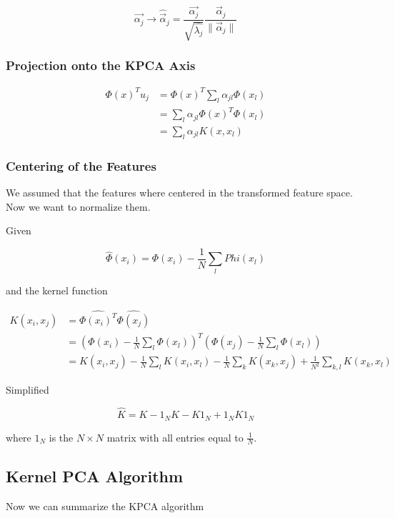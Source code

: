 \[
    \vec{\alpha_j} \to \hat{\vec{\alpha}}_j = \frac{\vec{\alpha_j}}{\sqrt{\hat{\lambda_j}}} \frac{\vec{\alpha}_j}{\|\vec{\alpha}_j\|}
\]

\subsubsection{Projection onto the KPCA Axis}

\begin{align*}
    \Phi(x)^T u_j &= \Phi(x)^T \sum_{l} \alpha_{jl} \Phi(x_l) \\
    &= \sum_{l} \alpha_{jl} \Phi(x)^T \Phi(x_l) \\
    &= \sum_{l} \alpha_{jl} K(x, x_l)
\end{align*}

\subsubsection{Centering of the Features}

We assumed that the features where centered in the transformed feature space. Now we want to normalize them.

Given 

\[
    \hat{\Phi}(x_i) = \Phi(x_i) - \frac{1}{N} \sum_{l} Phi(x_l)
\]

and the kernel function

\begin{align*} 
    K(x_i, x_j) &= \hat{\Phi(x_i)^T} \hat{\Phi(x_j)} \\ 
    &= \left( \Phi(x_i) - \frac{1}{N} \sum_{l} \Phi(x_l) \right)^T \left( \Phi(x_j) - \frac{1}{N} \sum_{l} \Phi(x_l) \right) \\
    &= K(x_i, x_j) - \frac{1}{N} \sum_{l} K(x_i, x_l) - \frac{1}{N} \sum_{k} K(x_k, x_j) + \frac{1}{N^2} \sum_{k,l} K(x_k, x_l)
\end{align*}

Simplified 

\[
    \hat{K} = K - 1_N K - K 1_N + 1_N K 1_N
\]

where \(1_N\) is the \(N \times N\) matrix with all entries equal to \(\frac{1}{N}\). 

\subsection{Kernel PCA Algorithm}

Now we can summarize the KPCA algorithm

